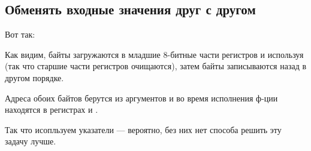\subsection{Обменять входные значения друг с другом}

Вот так:



Как видим, байты загружаются в младшие 8-битные части регистров  и  используя 
(так что старшие части регистров очищаются), затем байты записываются назад в другом порядке.



Адреса обоих байтов берутся из аргументов и во время исполнения ф-ции находятся в регистрах  и .

Так что исопльзуем указатели --- вероятно, без них нет способа решить эту задачу лучше.

